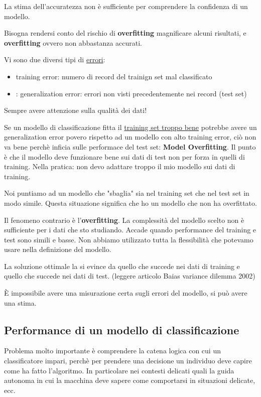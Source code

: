 La stima dell'accuratezza non \`e sufficiente per comprendere la confidenza di un modello.

Bisogna rendersi conto del rischio di \textbf{overfitting} magnificare alcuni risultati, e \textbf{overfitting} ovvero non abbastanza accurati.

Vi sono due diversi tipi di \underline{errori}:
\begin{itemize}
	\item training error: numero di record del trainign set mal classificato
	\item: generalization error: errori non visti precedentemente nei record (test set)
\end{itemize}

Sempre avere attenzione sulla qualit\`a dei dati! 

Se un modello di classificazione fitta il \underline{training set troppo bene} potrebbe avere un generalization error povero rispetto ad un modello con alto training error, ciò non va bene perch\`e inficia sulle performace del test set: \textbf{Model Overfitting}. Il punto \`e che il modello deve funzionare bene sui dati di test non per forza in quelli di training. Nella pratica: non devo adattare troppo il mio modello sui dati di training. 

Noi puntiamo ad un modello che "sbaglia" sia nel training set che nel test set in modo simile. Questa situazione significa che ho un modello che non ha overfittato. 

Il fenomeno contrario \`e l'\textbf{overfitting}. La complessit\`a del modello scelto non \`e sufficiente per i dati che sto studiando. Accade quando performance del training e test sono simili e basse. Non abbiamo utilizzato tutta la flessibilit\`a che potevamo usare nella definizione del modello.

La soluzione ottimale la si evince da quello che succede nei dati di training e quello che succede nei dati di test. (leggere articolo Baias variance dilemma 2002)

\`E impossibile avere una misurazione certa sugli errori del modello, si pu\`o avere una stima. 

\subsection{Performance di un modello di classificazione}
Problema molto importante \`e comprendere la catena logica con cui un classificatore impari, perch\`e per prendere una decisione un individuo deve capire come ha fatto l'algoritmo. In particolare nei contesti delicati quali la guida autonoma in cui la macchina deve sapere come comportarsi in situazioni delicate, ecc. 

